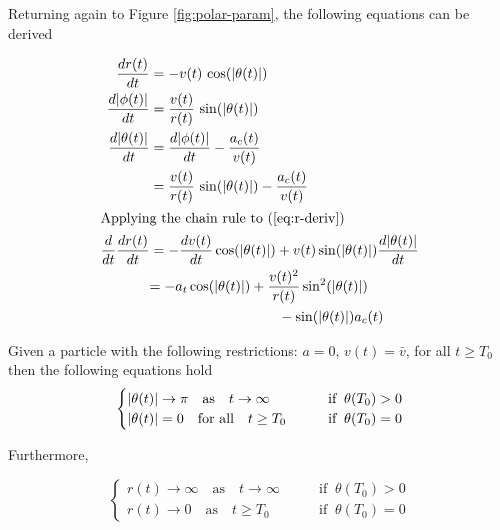 Returning again to Figure \ref{fig:polar-param}, the following equations can be derived

\begin{align}
  \frac{dr(t)}{dt}& = -v(t) \, \cos\paren{\abs{\theta(t)}}\label{eq:r-deriv}\\
  \frac{d\abs{\phi(t)}}{dt}& = \frac{v(t)}{r(t)} \, \sin\paren{\abs{\theta(t)}}\label{eq:phi-deriv}\\
  \frac{d\abs{\theta(t)}}{dt}& = \frac{d\abs{\phi(t)}}{dt} - \frac{a_c(t)}{v(t)}\\
  &= \frac{v(t)}{r(t)} \, \sin\paren{\abs{\theta(t)}} - \frac{a_c(t)}{v(t)}\label{eq:theta-deriv}\\
  \intertext{Applying the chain rule to (\ref{eq:r-deriv})}
  \frac{d}{dt} \frac{dr(t)}{dt}& = -\frac{dv(t)}{dt} \cos\paren{\abs{\theta(t)}} + v(t) \sin\paren{\abs{\theta(t)}} \frac{d\abs{\theta(t)}}{dt}\\
  &\begin{aligned}
    = -a_t \cos\paren{\abs{\theta(t)}} &+ \frac{v(t)^2}{r(t)} \sin^2\paren{\abs{\theta(t)}}\\
    &\qquad - \sin\paren{\abs{\theta(t)}} a_c(t) \label{eq:r-deriv-2}
  \end{aligned}
\end{align}

\begin{lemma}\label{lemma:polar-assymptote}
  Given a particle with the following restrictions: $a = 0$, $v(t) = \bar{v}$, for all $t \ge T_0$then the following equations hold
  \[
    \begin{cases}
      \abs{\theta(t)} \to \pi \quad \text{as} \quad t \to \infty \qquad &\text{if} \;\; \theta(T_0) > 0\\
      \abs{\theta(t)} = 0 \quad \text{for all} \quad t \ge T_0 \qquad &\text{if} \;\; \theta(T_0) = 0
    \end{cases}
  \]

    Furthermore,

  \[
    \begin{cases}
      r(t) \to \infty \quad \text{as} \quad t \to \infty \qquad &\text{if} \;\; \theta(T_0) > 0\\
      r(t) \to 0 \quad \text{as} \quad t \ge T_0 \qquad &\text{if} \;\; \theta(T_0) = 0
    \end{cases}
  \]
\end{lemma}

